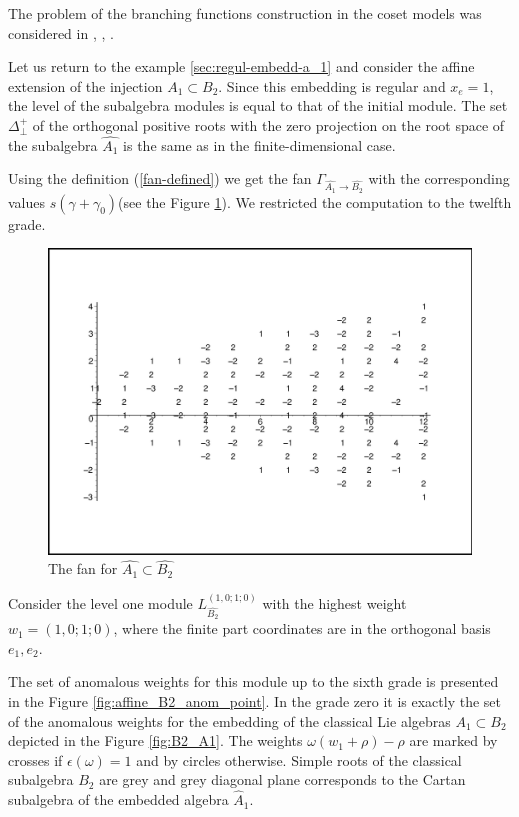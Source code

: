 \documentclass[12pt]{iopart}
\begin{document}
The problem of the branching functions construction in the coset models was considered
in  \cite{Dunbar:1992gh}, \cite{Hwang:1994yr}, \cite{lu1994branching}.

Let us return to the example \ref{sec:regul-embedd-a_1} and consider the affine extension of the injection
$A_1\subset B_2$.
Since this embedding is regular and $x_e=1$, the level of the  subalgebra modules is equal to that of the initial module.
The set $\Delta^{+}_{\bot}$ of the orthogonal positive roots with the zero projection
on the root space of the subalgebra $\hat{A_1}$ is the same as in the finite-dimensional case.

Using the definition (\ref{fan-defined}) we get the fan
$\Gamma_{\hat{A_1} \longrightarrow  \hat{B_2} }$
with the corresponding values $s(\gamma+\gamma_0)$(see the Figure \ref{fig:AffineB2A1Fan}).
We restricted the computation to the twelfth grade.
\begin{figure}[h!bt]
  \centering
  \includegraphics[width=135mm]{figure10.eps}
  \caption{The fan for $\hat{A_1}\subset \hat{B_2}$}
  \label{fig:AffineB2A1Fan}
\end{figure}


Consider the level one module $L^{\left( 1,0;1;0 \right)}_{\hat{B_2}}$  with the highest weight $w_1=(1,0;1;0)$,
where the finite part coordinates are in the orthogonal basis $e_1,e_2$.

The set of anomalous weights for this module up to the sixth grade is presented in the Figure \ref{fig:affine_B2_anom_point}.
In the grade zero it is exactly the set of the anomalous weights for the embedding of
the classical Lie algebras $A_1\subset B_2$ depicted in the  Figure \ref{fig:B2_A1}.
The weights $\omega (w_1+\rho)-\rho$ are marked by crosses if $\epsilon(\omega)=1$ and by circles otherwise.
Simple roots of the classical subalgebra $B_2$ are grey and grey diagonal plane corresponds to the Cartan subalgebra
of the embedded algebra $\hat{A}_1$.
\end{document}
